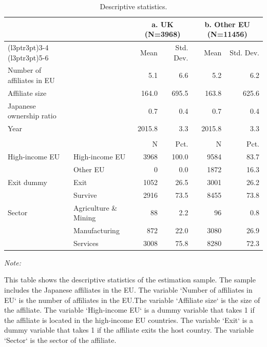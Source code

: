 \begin{table}[ht]
\centering
\caption{\label{tab:descriptive-statistics}Descriptive statistics. \label{tab:desc}}
\centering
\begin{threeparttable}
\begin{tabular}[t]{llrrrr}
\toprule
\multicolumn{2}{c}{ } & \multicolumn{2}{c}{a. UK (N=3968)} & \multicolumn{2}{c}{b. Other EU (N=11456)} \\
\cmidrule(l{3pt}r{3pt}){3-4} \cmidrule(l{3pt}r{3pt}){5-6}
  &    & Mean & Std. Dev. & Mean & Std. Dev.\\
\midrule
Number of affiliates in EU &  & 5.1 & 6.6 & 5.2 & 6.2\\
Affiliate size &  & 164.0 & 695.5 & 163.8 & 625.6\\
Japanese ownership ratio &  & 0.7 & 0.4 & 0.7 & 0.4\\
Year &  & 2015.8 & 3.3 & 2015.8 & 3.3\\
\midrule\\
 &  & N & Pct. & N & Pct.\\
High-income EU & High-income EU & 3968 & 100.0 & 9584 & 83.7\\
 & Other EU & 0 & 0.0 & 1872 & 16.3\\
Exit dummy & Exit & 1052 & 26.5 & 3001 & 26.2\\
 & Survive & 2916 & 73.5 & 8455 & 73.8\\
Sector & Agriculture \& Mining & 88 & 2.2 & 96 & 0.8\\
 & Manufacturing & 872 & 22.0 & 3080 & 26.9\\
 & Services & 3008 & 75.8 & 8280 & 72.3\\
\bottomrule
\end{tabular}
\begin{tablenotes}
\item \textit{Note: } 
\item This table shows the descriptive statistics of the estimation sample. The sample includes the Japanese affiliates in the EU. The variable `Number of affiliates in EU` is the number of affiliates in the EU.The variable `Affiliate size` is the size of the affiliate. The variable `High-income EU` is a dummy variable that takes 1 if the affiliate is located in the high-income EU countries. The variable `Exit` is a dummy variable that takes 1 if the affiliate exits the host country. The variable `Sector` is the sector of the affiliate.
\end{tablenotes}
\end{threeparttable}
\end{table}
